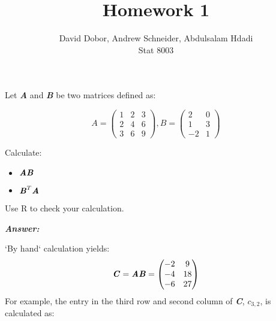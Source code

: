 \documentclass[12pt]{article}
\newcommand{\blditA}{\textbf{\textit{A}}}
\newcommand{\blditB}{\textbf{\textit{B}}}
\newcommand{\blditC}{\textbf{\textit{C}}}
\newenvironment{question}[2][Question]{\begin{trivlist}
\item[\hskip \labelsep {\bfseries #1}\hskip \labelsep {\bfseries #2.}]}{\end{trivlist}}
\begin{document}
 

 
\title{Homework 1}%
\author{David Dobor, Andrew Schneider,  Abdulsalam Hdadi\\ %
Stat 8003} %
 
\maketitle
 
 
\begin{question}{1.1} %
Let \blditA $ $ and \blditB $ $ be two matrices defined as:

\begin{equation*}
A = \begin{pmatrix}
  1 & 2 & 3\\
  2 & 4 & 6\\
  3 & 6 & 9
\end{pmatrix},
B = \begin{pmatrix}
  2 & 0\\
  1 & 3\\
 -2 & 1
\end{pmatrix}
\end{equation*}

Calculate:

\begin{itemize}
  \item $\blditA \blditB$
  \item $\blditB^T \blditA $
\end{itemize}

Use R to check your calculation.

 \end{question}
 
 
 \textbf{\emph{Answer:} }
 
`By hand` calculation yields:
\begin{equation*}
\blditC  = \blditA \blditB = 
\begin{pmatrix}
  -2 & 9\\
  -4 & 18\\
  -6 & 27
\end{pmatrix}
\end{equation*}
 For example, the entry in the third row and second column of \blditC, $c_{3,2}$, is calculated as:
 
\end{document}
